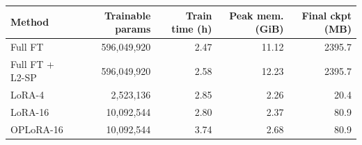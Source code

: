 \begin{tabular}{lrrrr}
\toprule
Method & Trainable params & Train time (h) & Peak mem. (GiB) & Final ckpt (MB) \\
\midrule
Full FT & 596,049,920 & 2.47 & 11.12 & 2395.7 \\
Full FT + L2-SP & 596,049,920 & 2.58 & 12.23 & 2395.7 \\
LoRA-4 & 2,523,136 & 2.85 & 2.26 & 20.4 \\
LoRA-16 & 10,092,544 & 2.80 & 2.37 & 80.9 \\
OPLoRA-16 & 10,092,544 & 3.74 & 2.68 & 80.9 \\
\bottomrule
\end{tabular}